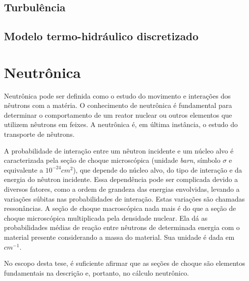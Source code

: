 \subsection{Turbulência}
\label{subsec:}

\subsection{Modelo termo-hidráulico discretizado}
\label{subsec:modeloth}



\section{Neutrônica}
\label{sec:neutronica}

Neutrônica pode ser definida como o estudo do movimento e interações dos nêutrons
com a matéria. O conhecimento de neutrônica é fundamental para determinar o
comportamento de um reator nuclear ou outros elementos que utilizem nêutrons
em feixes. A neutrônica é, em última instância, o estudo do transporte de nêutrons.

A probabilidade de interação entre um nêutron incidente e um núcleo alvo é caracterizada
pela seção de choque microscópica (unidade \textit{barn}, símbolo $\sigma$ e
equivalente a $10^{-24} cm^2$), que depende do núcleo alvo, do tipo de interação e da
energia do nêutron incidente. Essa dependência pode ser complicada devido a diversos fatores,
como a ordem de grandeza das energias envolvidas, levando a variações súbitas nas probabilidades
de interação. Estas variações são chamadas ressonâncias. A seção de choque macroscópica nada mais
é do que a seção de choque microscópica multiplicada pela densidade nuclear. Ela dá as probabilidades
médias de reação entre nêutrons de determinada energia com o material presente considerando a massa
do material. Sua unidade é dada em $cm^{-1}$.

No escopo desta tese, é suficiente afirmar que as seções de choque são elementos fundamentais
na descrição e, portanto, no cálculo neutrônico. 

